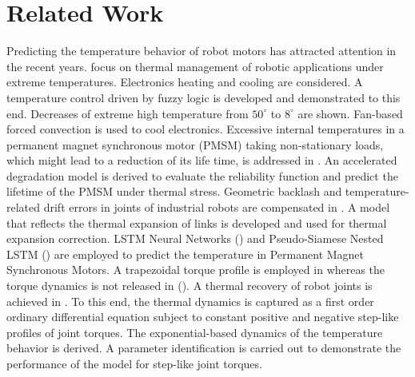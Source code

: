 \documentclass{ifacconf}
\begin{document}
\section{Related Work}
\label{chap:relatedworks}
Predicting the temperature behavior of robot motors has attracted attention in the recent years. %
\cite{afaq2023intelligent} focus on thermal management of robotic applications under extreme temperatures. Electronics heating and cooling are considered. A temperature control driven by fuzzy logic is developed and demonstrated to this end. Decreases of extreme high temperature from $50^{\circ}$ to $8^{\circ}$ are shown. Fan-based forced convection is used to cool electronics. Excessive internal temperatures in a permanent magnet synchronous motor (PMSM)  taking non-stationary loads, which might lead to a reduction of its life time, is addressed in \cite{chen2024lifetime}. An accelerated degradation model is derived to evaluate the reliability function and predict the lifetime of the PMSM under thermal stress.  Geometric backlash and temperature-related drift errors in joints of industrial robots are compensated in \cite{sigron2023compensation}. A model that reflects the thermal expansion of links is developed and used for thermal expansion correction.  LSTM Neural
Networks (\cite{he2024rotor})  and   Pseudo-Siamese Nested LSTM (\cite{cai2021temperature}) are employed to predict the temperature in Permanent Magnet Synchronous Motors. A trapezoidal torque profile is employed in \cite{he2024rotor} whereas the torque dynamics is not released in (\cite{cai2021temperature}). A thermal recovery of robot joints is achieved in  \cite{jorgensen2019thermal}. To this end, the thermal dynamics is captured as a first order ordinary differential equation subject to constant positive and negative step-like profiles of joint torques. The exponential-based dynamics of the temperature behavior is derived.  A parameter identification is carried out to demonstrate the performance of the model for step-like joint torques. %
\end{document}
